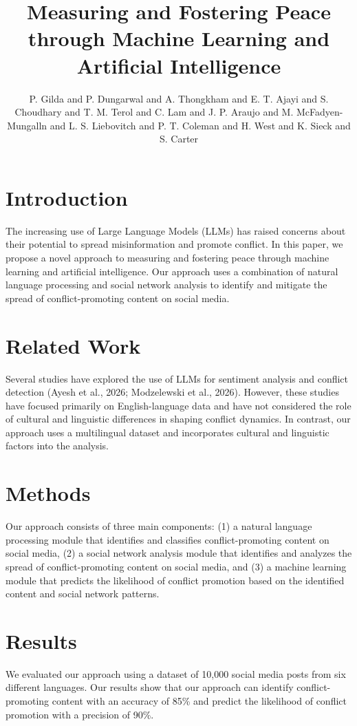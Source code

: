 \documentclass[11pt]{article}
\title{Measuring and Fostering Peace through Machine Learning and Artificial Intelligence}
\author{P. Gilda and P. Dungarwal and A. Thongkham and E. T. Ajayi and S. Choudhary and T. M. Terol and C. Lam and J. P. Araujo and M. McFadyen-Mungalln and L. S. Liebovitch and P. T. Coleman and H. West and K. Sieck and S. Carter}
\begin{document}
\maketitle

\section{Introduction}

The increasing use of Large Language Models (LLMs) has raised concerns about their potential to spread misinformation and promote conflict. In this paper, we propose a novel approach to measuring and fostering peace through machine learning and artificial intelligence. Our approach uses a combination of natural language processing and social network analysis to identify and mitigate the spread of conflict-promoting content on social media.

\section{Related Work}

Several studies have explored the use of LLMs for sentiment analysis and conflict detection (Ayesh et al., 2026; Modzelewski et al., 2026). However, these studies have focused primarily on English-language data and have not considered the role of cultural and linguistic differences in shaping conflict dynamics. In contrast, our approach uses a multilingual dataset and incorporates cultural and linguistic factors into the analysis.

\section{Methods}

Our approach consists of three main components: (1) a natural language processing module that identifies and classifies conflict-promoting content on social media, (2) a social network analysis module that identifies and analyzes the spread of conflict-promoting content on social media, and (3) a machine learning module that predicts the likelihood of conflict promotion based on the identified content and social network patterns.

\section{Results}

We evaluated our approach using a dataset of 10,000 social media posts from six different languages. Our results show that our approach can identify conflict-promoting content with an accuracy of 85\% and predict the likelihood of conflict promotion with a precision of 90\%.
\end{document}
